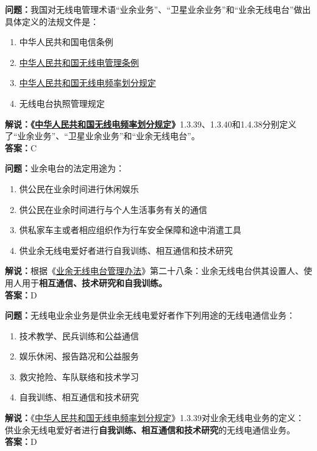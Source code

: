 \textbf{问题：}我国对无线电管理术语“业余业务”、“卫星业余业务”和“业余无线电台”做出具体定义的法规文件是：
\begin{enumerate}[label=\Alph*), leftmargin=1.5cm]
	\item 中华人民共和国电信条例
	\item \href{http://www.gov.cn/zhengce/content/2016-11/25/content_5137687.htm}{中华人民共和国无线电管理条例}
	\item \href{https://www.miit.gov.cn/zwgk/zcwj/wjfb/txy/art/2020/art_066386284cd2449493586c81ccafed11.html}{中华人民共和国无线电频率划分规定}
	\item 无线电台执照管理规定
\end{enumerate}
\textbf{解说：《\href{https://www.miit.gov.cn/zwgk/zcwj/wjfb/txy/art/2020/art_066386284cd2449493586c81ccafed11.html}{中华人民共和国无线电频率划分规定}》}1.3.39、1.3.40和1.4.38分别定义了“业余业务”、“卫星业余业务”和“业余无线电台”。\\\textbf{答案：}C


\textbf{问题：}业余电台的法定用途为：
\begin{enumerate}[label=\Alph*), leftmargin=1.5cm]
	\item 供公民在业余时间进行休闲娱乐
	\item 供公民在业余时间进行与个人生活事务有关的通信
	\item 供私家车主或者相应组织作为行车安全保障和途中消遣工具
	\item 供业余无线电爱好者进行自我训练、相互通信和技术研究
\end{enumerate}
\textbf{解说：}根据《\href{https://www.miit.gov.cn/jgsj/zfs/bmgz/art/2020/art_147b69815b3641caad9047735f94c860.html}{业余无线电台管理办法}》第二十八条：业余无线电台供其设置人、使用人用于\textbf{相互通信、技术研究和自我训练。}\\\textbf{答案：}D


\textbf{问题：}无线电业余业务是供业余无线电爱好者作下列用途的无线电通信业务：
\begin{enumerate}[label=\Alph*), leftmargin=1.5cm]
	\item 技术教学、民兵训练和公益通信
	\item 娱乐休闲、报告路况和公益服务
	\item 救灾抢险、车队联络和技术学习
	\item 自我训练、相互通信和技术研究
\end{enumerate}
\textbf{解说：}《\href{https://www.miit.gov.cn/zwgk/zcwj/wjfb/txy/art/2020/art_066386284cd2449493586c81ccafed11.html}{中华人民共和国无线电频率划分规定}》1.3.39对业余无线电业务的定义：供业余无线电爱好者进行\textbf{自我训练、相互通信和技术研究}的无线电通信业务。\\\textbf{答案：}D


